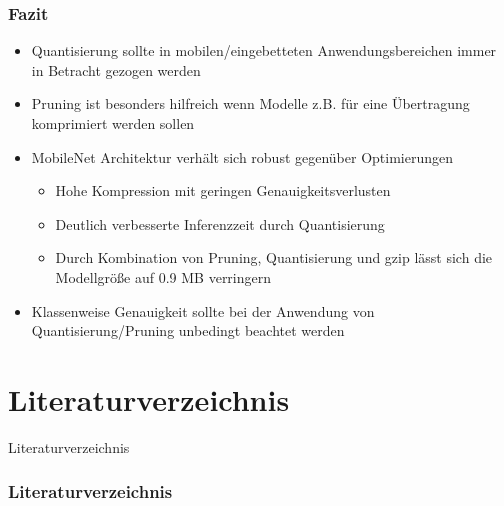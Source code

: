 \documentclass{beamer}
\begin{document}
\begin{frame}
\frametitle{Fazit}

\begin{itemize}
	\item Quantisierung sollte in mobilen/eingebetteten Anwendungsbereichen immer in Betracht gezogen werden	
	\item Pruning ist besonders hilfreich wenn Modelle z.B. für eine Übertragung komprimiert werden sollen
	\item MobileNet Architektur verhält sich robust gegenüber Optimierungen
	\begin{itemize}
		\item Hohe Kompression mit geringen Genauigkeitsverlusten
		\item Deutlich verbesserte Inferenzzeit durch Quantisierung
		\item Durch Kombination von Pruning, Quantisierung und gzip lässt sich die Modellgröße auf 0.9 MB verringern
	\end{itemize}
	\item Klassenweise Genauigkeit sollte bei der Anwendung von Quantisierung/Pruning unbedingt beachtet werden
\end{itemize}

\end{frame}




\section{Literaturverzeichnis}
\begin{frame}
\huge
\centering
Literaturverzeichnis
\end{frame}


\begin{frame}[allowframebreaks]
\frametitle{Literaturverzeichnis}


\end{frame}
\end{document}
